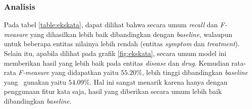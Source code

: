 	\subsubsection{Analisis}
	Pada tabel \ref{table:ekskata}, dapat dilihat bahwa secara umum \textit{recall} dan \textit{F-measure} yang dihasilkan lebih baik dibandingkan dengan \textit{baseline}, walaupun untuk beberapa entitas nilainya lebih rendah (entitas \textit{symptom} dan \textit{treatment}). Selain itu, apabila dilihat pada grafik \ref{fig:ekskata}, secara umum model ini memberikan hasil yang lebih baik pada entitas \textit{disease} dan \textit{drug}. Kemudian rata-rata \textit{F-measure} yang didapatkan yaitu $ 55.20\% $, lebih tinggi dibandingkan \textit{baseline} yang \saya~gunakan yaitu $ 54.09\% $. Hal ini sangat menarik karena hanya dengan penggunaan fitur kata saja, hasil yang diberikan secara umum lebih baik dibandingkan \textit{baseline}.
	
